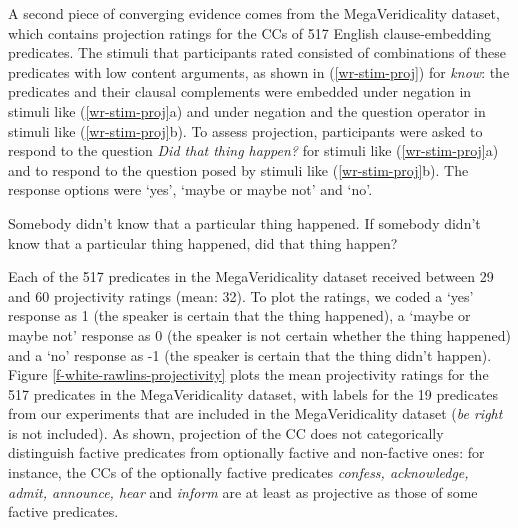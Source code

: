 \documentclass[11pt,fleqn]{article}
\newcommand{\6}{\mbox{$[\hspace*{-.6mm}[$}}
\newcommand{\9}{\mbox{$]\hspace*{-.6mm}]$}}
\begin{document}
A second piece of converging evidence comes from the MegaVeridicality dataset, which contains projection ratings for the CCs of 517 English clause-embedding predicates. The stimuli that participants rated consisted of combinations of these predicates with low content arguments, as shown in (\ref{wr-stim-proj}) for {\em know}: the predicates and their clausal complements were embedded under negation in stimuli like (\ref{wr-stim-proj}a) and under negation and the question operator in stimuli like (\ref{wr-stim-proj}b). To assess projection, participants were asked to respond to the question {\em Did that thing happen?} for stimuli like (\ref{wr-stim-proj}a) and to respond to the question posed by stimuli like (\ref{wr-stim-proj}b). The response options were `yes', `maybe or maybe not' and `no'. 

\begin{exe}
\ex\label{wr-stim-proj}
\begin{xlist}
\ex Somebody didn't know that a particular thing happened.
\ex If somebody didn't know that a particular thing happened, did that thing happen?
\end{xlist}
\end{exe}

Each of the 517 predicates in the MegaVeridicality dataset received between 29 and 60 projectivity ratings (mean: 32). To plot the ratings, we coded a `yes' response as 1 (the speaker is certain that the thing happened),  a `maybe or maybe not' response as 0 (the speaker is not certain whether the thing happened) and a `no' response as -1 (the speaker is certain that the thing didn't happen). Figure \ref{f-white-rawlins-projectivity} plots the mean projectivity ratings for the 517 predicates in the MegaVeridicality dataset, with labels for the 19 predicates from our experiments that are included in the MegaVeridicality dataset ({\em be right} is not included). As shown, projection of the CC does not categorically distinguish factive predicates from optionally factive and non-factive ones: for instance, the CCs of the optionally factive predicates {\em confess, acknowledge, admit, announce, hear} and {\em inform} are at least as projective as those of some factive predicates. 
\end{document}
